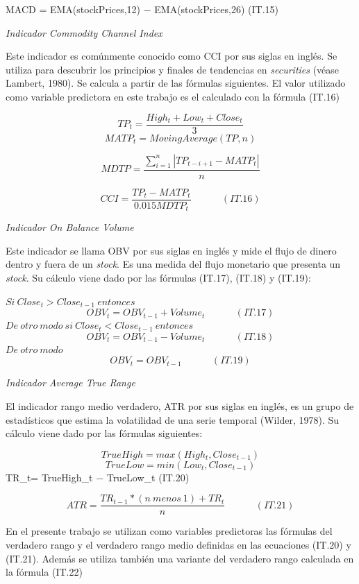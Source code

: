 \documentclass[]{DissertateUSU}
\begin{document}
MACD = EMA(stockPrices,12) − EMA(stockPrices,26) (IT.15)

\emph{Indicador Commodity Channel Index}

\noindent Este indicador es comúnmente conocido como CCI por sus siglas
en inglés. Se utiliza para descubrir los principios y finales de
tendencias en \emph{securities} (véase Lambert, 1980). Se calcula a
partir de las fórmulas siguientes. El valor utilizado como variable
predictora en este trabajo es el calculado con la fórmula (IT.16)

\[TP_t=\frac{High_t+Low_t+Close_t}{3}\] \[MATP_t = MovingAverage(TP,n)\]

\[MDTP= \frac{\sum_{i=1}^{n}|TP_{t-i+1}-MATP_t|}{n}\]

\[CCI=\frac{TP_t-MATP_t}{0.015MDTP_t} \ \ \ \ \ \ \ \ \ \ \ \ \ \ (IT.16)\]

\emph{Indicador On Balance Volume}

\noindent Este indicador se llama OBV por sus siglas en inglés y mide el
flujo de dinero dentro y fuera de un \emph{stock}. Es una medida del
flujo monetario que presenta un \emph{stock}. Su cálculo viene dado por
las fórmulas (IT.17), (IT.18) y (IT.19):

\noindent \(Si \  Close_t > Close_{t-1} \ entonces\)
\[OBV_t = OBV_{t-1} + Volume_t \ \ \ \ \ \ \ \ \ \ \ \ \ \ (IT.17)\]
\(De \ otro \ modo \ si \  Close_t < Close_{t-1} \ entonces\)
\[OBV_t = OBV_{t-1} - Volume_t \ \ \ \ \ \ \ \ \ \ \ \ \ \ (IT.18)\]
\(De \ otro \ modo\)
\[OBV_t = OBV_{t-1} \ \ \ \ \ \ \ \ \ \ \ \ \ \ (IT.19)\]

\setlength\parskip{5ex}

\emph{Indicador Average True Range}

\noindent El indicador rango medio verdadero, ATR por sus siglas en
inglés, es un grupo de estadísticos que estima la volatilidad de una
serie temporal (Wilder, 1978). Su cálculo viene dado por las fórmulas
siguientes:

\[TrueHigh = max(High_t, Close_{t-1})\]
\[TrueLow = min(Low_t, Close_{t-1})\] TR\_t= TrueHigh\_t − TrueLow\_t
(IT.20)

\[ATR =\frac{TR_{t-1} * (n \ menos \ {1}) + TR_t}{n} \ \ \ \ \ \ \ \ \ \ \ \ \ \ (IT.21)\]

\noindent En el presente trabajo se utilizan como variables predictoras
las fórmulas del verdadero rango y el verdadero rango medio definidas en
las ecuaciones (IT.20) y (IT.21). Además se utiliza también una variante
del verdadero rango calculada en la fórmula (IT.22)
\end{document}
